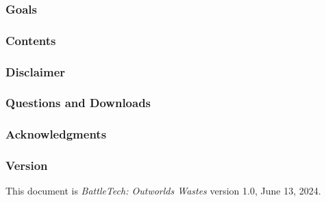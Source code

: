 

\subsubsection*{Goals}



\subsubsection*{Contents}



\subsubsection*{Disclaimer}



\subsubsection*{Questions and Downloads}



\subsubsection*{Acknowledgments}



\subsubsection*{Version}

This document is \emph{BattleTech: Outworlds Wastes} version 1.0, June 13, 2024.

\newpage

\vspace*{\fill}

\vspace*{\fill}
